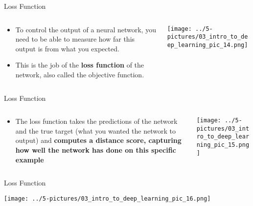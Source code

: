 \documentclass[11pt]{beamer}
\begin{document}
\begin{frame}{Loss Function}
\begin{columns}[T] %
\begin{column}{.48\textwidth}
        \begin{itemize}
		\item To control the output of a neural network, you need to be able to measure how far this output is from what you expected. 
		\item This is the job of the \textbf{loss function} of the network, also called the objective function. 
        \end{itemize}
\end{column}%
\hfill%
\begin{column}{.48\textwidth}
        \texttt{[image: ../5-pictures/03\_intro\_to\_deep\_learning\_pic\_14.png]}
\end{column}%
\end{columns}
\end{frame}
\begin{frame}{Loss Function}
\begin{columns}[T] %
\begin{column}{.48\textwidth}
        \begin{itemize}
		\item The loss function takes the predictions of the network and the true target (what you wanted the network to output) and \textbf{computes a distance score, capturing how well the network has done on this specific example}
        \end{itemize}
\end{column}%
\hfill%
\begin{column}{.48\textwidth}
        \texttt{[image: ../5-pictures/03\_intro\_to\_deep\_learning\_pic\_15.png]}
\end{column}%
\end{columns}
\end{frame}
\begin{frame}{Loss Function}
	\begin{center}
	\texttt{[image: ../5-pictures/03\_intro\_to\_deep\_learning\_pic\_16.png]}
	\end{center}
\end{frame}
\end{document}

